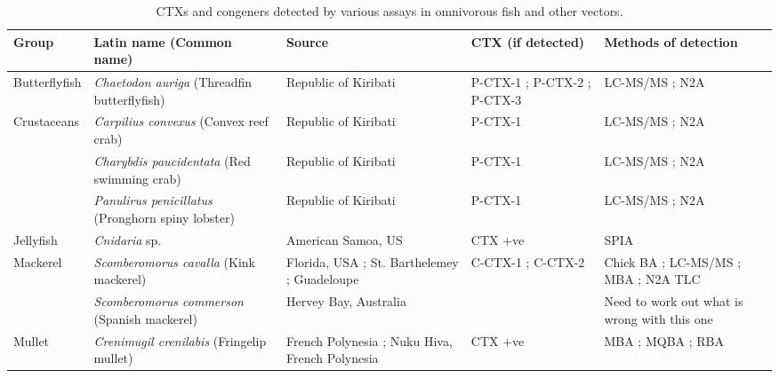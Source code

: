 \documentclass[12pt]{article}
\begin{document}
	\begin{longtable}[l]{ | p{2cm} | p{3cm} | p{4.5cm} | p{2cm} | p{3cm} | }
	\caption{CTXs and congeners detected by various assays in omnivorous fish and other vectors.}\\
	\hline
	\label{tbl:OmniTable}
	\textbf{Group} & \textbf{Latin name} (Common name) & \textbf{Source} & \textbf{CTX (if detected)} & \textbf{Methods of detection} \\
	\hline
	Butterflyfish & \emph{Chaetodon auriga} (Threadfin butterflyfish) & Republic of Kiribati \cite{mak2013pacific} & P-CTX-1 \cite{mak2013pacific}; P-CTX-2 \cite{mak2013pacific}; P-CTX-3 \cite{mak2013pacific} & LC-MS/MS \cite{mak2013pacific}; N2A \cite{mak2013pacific} \\
	\hline
	Crustaceans & \emph{Carpilius convexus} (Convex reef crab) & Republic of Kiribati \cite{mak2013pacific} & P-CTX-1 \cite{mak2013pacific} & LC-MS/MS \cite{mak2013pacific}; N2A \cite{mak2013pacific} \\
	& \emph{Charybdis paucidentata} (Red swimming crab) & Republic of Kiribati \cite{mak2013pacific} & P-CTX-1 \cite{mak2013pacific} & LC-MS/MS \cite{mak2013pacific}; N2A \cite{mak2013pacific} \\
	& \emph{Panulirus penicillatus} (Pronghorn spiny lobster) & Republic of Kiribati \cite{mak2013pacific} & P-CTX-1 \cite{mak2013pacific} & LC-MS/MS \cite{mak2013pacific}; N2A \cite{mak2013pacific} \\
	\hline
	Jellyfish & \emph{Cnidaria} sp. & American Samoa, US \cite{zlotnick1995ciguatera} & CTX +ve \cite{zlotnick1995ciguatera} & SPIA \cite{zlotnick1995ciguatera} \\
	\hline
	Mackerel & \emph{Scomberomorus cavalla} (Kink mackerel) & Florida, USA \cite{dickey2008ciguatera}; St. Barthelemey \cite{pottier2001ciguatera,vernoux1986heterogeneity}; Guadeloupe \cite{pottier2001ciguatera} & C-CTX-1 \cite{dickey2008ciguatera}; C-CTX-2 \cite{dickey2008ciguatera} & Chick BA \cite{pottier2001ciguatera}; LC-MS/MS \cite{dickey2008ciguatera}; MBA \cite{vernoux1986heterogeneity}; N2A \cite{dickey2008ciguatera} TLC \cite{vernoux1986heterogeneity} \\
	& \emph{Scomberomorus commerson} (Spanish mackerel) & Hervey Bay, Australia \cite{} & & Need to work out what is wrong with this one\\ %
	\hline
	Mullet & \emph{Crenimugil crenilabis} (Fringelip mullet) & French Polynesia \cite{bagnis1987use}; Nuku Hiva, French Polynesia \cite{darius2007ciguatera} & CTX +ve \cite{darius2007ciguatera} & MBA \cite{bagnis1987use}; MQBA \cite{bagnis1987use}; RBA \cite{darius2007ciguatera}\\

\end{longtable}
\end{document}

